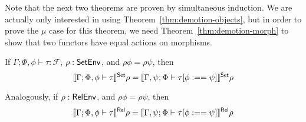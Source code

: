 \documentclass[acmsmall,review,anonymous]{acmart}
\theoremstyle{definition}
\newcommand{\F}{\mathcal{F}}
\begin{document}
Note that the next two theorems are proven by 
simultaneous induction. We are actually only interested in using Theorem~\ref{thm:demotion-objects}, 
but in order to prove the $\mu$ case for this theorem, we need Theorem~\ref{thm:demotion-morph} 
to show that two functors have equal actions on morphisms.


\begin{thm}\label{thm:demotion-objects}
If $\Gamma; \Phi, \phi \vdash  \tau : \F$, $\rho : \mathsf{SetEnv}$, and $\rho \phi = \rho \psi$, then
  $$\llbracket{\Gamma; \Phi, \phi \vdash \tau}\rrbracket^{\mathsf{Set}} \rho = \llbracket{\Gamma, \psi; \Phi \vdash \tau[\phi :== \psi] }\rrbracket^{\mathsf{Set}} \rho $$

Analogously, if $\rho :\mathsf{RelEnv}$, and $\rho \phi = \rho \psi$, then
$$\llbracket{\Gamma; \Phi, \phi \vdash \tau}\rrbracket^{\mathsf{Rel}} \rho = \llbracket{\Gamma, \psi; \Phi \vdash \tau[\phi :== \psi] }\rrbracket^{\mathsf{Rel}} \rho $$

\end{thm}
\end{document}

